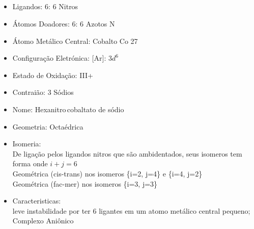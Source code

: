\documentclass[12pt]{article}
\begin{document}
	\subsection{}
	\begin{itemize}
   
   
   \item Ligandos: 6: 6 Nitros 
   
   
   \item Átomos Doadores: 6: 6 Azotos N
   
   \item Átomo Metálico Central: Cobalto Co 27
   
   \item Configuração Eletrónica: [Ar]: $ 3d^6 $
   
   \item Estado de Oxidação: III+
   
   \item Contraião: 3 Sódios 
   
   \item Nome: Hexanitro\,cobaltato de sódio
   
   \item Geometria: Octaédrica
   
   \item Isomeria:\\
   	De ligação pelos ligandos nitros que são ambidentados,
		seus isomeros tem forma  onde 		$i+j=6$\\
		Geométrica (cis-trans) nos isomeros \{i=2, j=4\} e
		\{i=4, j=2\}\\
		Geométrica (fac-mer) nos isomeros \{i=3, j=3\}
		

	\item Caracteristicas:\\
		leve instabilidade por ter 6 ligantes em um atomo metálico central pequeno;\\
		Complexo Aniônico

	\end{itemize}
	
\break

	
\end{document}
